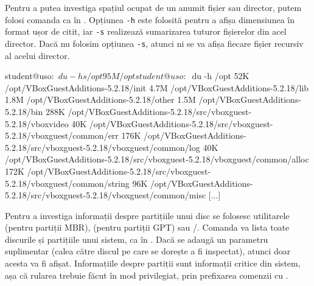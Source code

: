 Pentru a putea investiga spațiul ocupat de un anumit fișier sau director, putem
folosi comanda  ca în .
Opțiunea \texttt{-h} este folosită pentru a afișa dimensiunea în format ușor de citit, iar \texttt{-s} realizează sumarizarea tuturor
fișierelor din acel director. Dacă nu folosim opțiunea \texttt{-s}, atunci ni se va
afișa fiecare fișier recursiv al acelui director.

\begin{screen}[caption={Informații despre spațiul ocupat de directoare (du)},label={lst:storage:du}]
student@uso:~$ du -hs /opt
95M	/opt

student@uso:~$ du -h /opt
52K	/opt/VBoxGuestAdditions-5.2.18/init
4.7M	/opt/VBoxGuestAdditions-5.2.18/lib
1.8M	/opt/VBoxGuestAdditions-5.2.18/other
1.5M	/opt/VBoxGuestAdditions-5.2.18/bin
288K	/opt/VBoxGuestAdditions-5.2.18/src/vboxguest-5.2.18/vboxvideo
40K	/opt/VBoxGuestAdditions-5.2.18/src/vboxguest-5.2.18/vboxguest/common/err
176K	/opt/VBoxGuestAdditions-5.2.18/src/vboxguest-5.2.18/vboxguest/common/log
40K	/opt/VBoxGuestAdditions-5.2.18/src/vboxguest-5.2.18/vboxguest/common/alloc
172K	/opt/VBoxGuestAdditions-5.2.18/src/vboxguest-5.2.18/vboxguest/common/string
96K	/opt/VBoxGuestAdditions-5.2.18/src/vboxguest-5.2.18/vboxguest/common/misc
[...]
\end{screen}

Pentru a investiga informații despre partițiile unui disc se folosesc
utilitarele  (pentru partiții MBR),  (pentru partiții GPT) sau /. Comanda  va lista toate discurile și partițiile
unui sistem, ca în .
Dacă se adaugă un parametru suplimentar (calea către discul pe care se dorește a fi inspectat), atunci doar acesta va fi afișat.
Informațiile despre partiții sunt informații critice din sistem, așa că rularea trebuie făcut în mod privilegiat, prin prefixarea comenzii cu .

